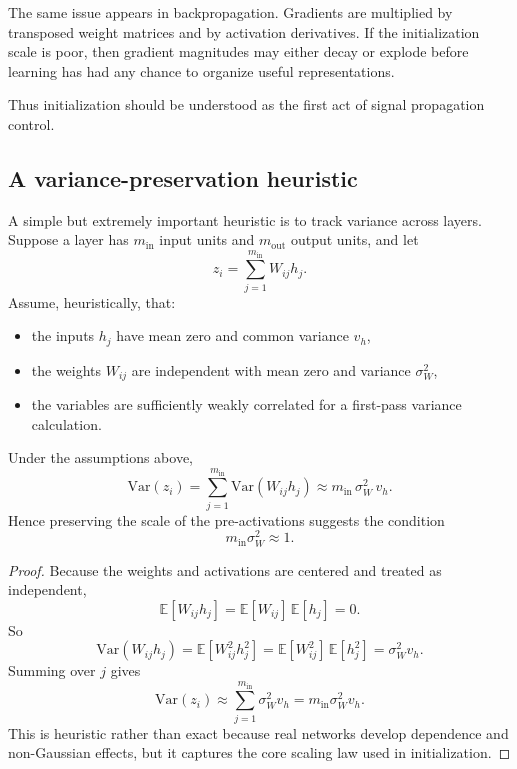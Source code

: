 \medskip

The same issue appears in backpropagation.
Gradients are multiplied by transposed weight matrices and by activation derivatives.
If the initialization scale is poor, then gradient magnitudes may either decay or explode before learning has had any chance to organize useful representations.

\medskip

Thus initialization should be understood as the first act of signal propagation control.

\subsection*{A variance-preservation heuristic}

A simple but extremely important heuristic is to track variance across layers.
Suppose a layer has $m_{\mathrm{in}}$ input units and $m_{\mathrm{out}}$ output units, and let
\[
z_i = \sum_{j=1}^{m_{\mathrm{in}}} W_{ij} h_j.
\]
Assume, heuristically, that:
\begin{itemize}
    \item the inputs $h_j$ have mean zero and common variance $v_h$,
    \item the weights $W_{ij}$ are independent with mean zero and variance $\sigma_W^2$,
    \item the variables are sufficiently weakly correlated for a first-pass variance calculation.
\end{itemize}

\begin{proposition}
Under the assumptions above,
\[
\mathrm{Var}(z_i)
=
\sum_{j=1}^{m_{\mathrm{in}}}\mathrm{Var}(W_{ij}h_j)
\approx
m_{\mathrm{in}}\,\sigma_W^2\,v_h.
\]
Hence preserving the scale of the pre-activations suggests the condition
\[
m_{\mathrm{in}}\sigma_W^2 \approx 1.
\]
\end{proposition}

\begin{proof}
Because the weights and activations are centered and treated as independent,
\[
\mathbb E[W_{ij}h_j]=\mathbb E[W_{ij}]\,\mathbb E[h_j]=0.
\]
So
\[
\mathrm{Var}(W_{ij}h_j)=\mathbb E[W_{ij}^2 h_j^2]
=\mathbb E[W_{ij}^2]\,\mathbb E[h_j^2]
=\sigma_W^2 v_h.
\]
Summing over $j$ gives
\[
\mathrm{Var}(z_i)
\approx
\sum_{j=1}^{m_{\mathrm{in}}}\sigma_W^2 v_h
=
m_{\mathrm{in}}\sigma_W^2 v_h.
\]
This is heuristic rather than exact because real networks develop dependence and non-Gaussian effects, but it captures the core scaling law used in initialization.
\end{proof}


